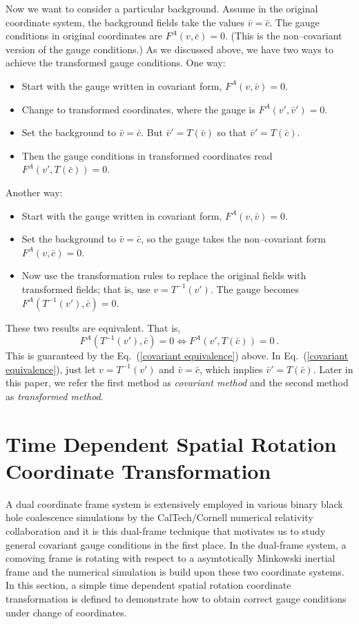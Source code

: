 Now we want to consider a particular background. Assume in the original coordinate system, the background fields take the values $\bar v = \bar c$. The gauge 
conditions in original coordinates are $F^A\left(v,\bar c\right) = 0$. (This is the non--covariant version of the gauge conditions.) As we discussed above, we have two ways to achieve the transformed gauge conditions. One way: 
\begin{itemize}
	\item Start with the gauge written in covariant form, $F^A\left(v,\bar v\right) = 0$.
	\item Change to transformed coordinates, where the gauge is $F^A\left(v',\bar v'\right) = 0$.
	\item Set the background to $\bar v = \bar c$. But $\bar v' = T\left(\bar v\right)$ so that $\bar v' = T\left(\bar c\right)$. 
	\item Then the gauge conditions in transformed coordinates read $F^A\left(v',T\left(\bar c\right)\right) = 0$. 
\end{itemize}
Another way: 
\begin{itemize}
	\item Start with the gauge written in covariant form, $F^A\left(v,\bar v\right) = 0$.
	\item Set the background to $\bar v = \bar c$, so the gauge takes the non--covariant form $F^A\left(v,\bar c\right) = 0$. 
	\item Now use the transformation rules to replace the original fields with transformed fields; that is, use $v = T^{-1}\left(v'\right)$. 
	The gauge becomes $F^A\left(T^{-1}\left(v'\right),\bar c\right) = 0$. 
\end{itemize}
These two results are equivalent. That is, 
\begin{equation}
	F^A\left(T^{-1}\left(v'\right),\bar c\right) = 0 \Longleftrightarrow F^A\left(v',T\left(\bar c\right)\right) = 0 \ .
\end{equation}
This is guaranteed by the Eq.~(\ref{covariant equivalence}) above. In Eq.~(\ref{covariant equivalence}), just let $v = T^{-1}\left(v'\right)$ and $\bar v = \bar c$, which implies $\bar v' = T\left(\bar c\right)$. Later in this paper, we refer the first method as {\em covariant method} and the second method as {\em transformed method}. 
\section{Time Dependent Spatial Rotation Coordinate Transformation}\label{example}
A dual coordinate frame system\cite{Scheel:2006gg} is extensively employed in various binary black hole coalescence simulations\cite{Scheel:2008rj, Szilagyi:2009qz} by the CalTech/Cornell numerical relativity collaboration and it is this dual-frame technique that motivates us to study general covariant gauge conditions in the first place. In the dual-frame system, a comoving frame is rotating with respect to a asymtotically Minkowski inertial frame and the numerical simulation is build upon these two coordinate systems. In this section, a simple time dependent spatial rotation coordinate transformation is defined to demonstrate how to obtain correct gauge conditions under change of coordinates. 

